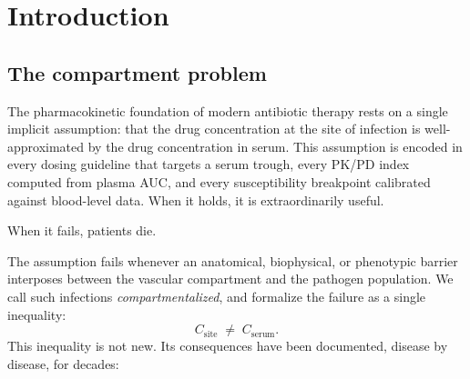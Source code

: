 \documentclass[11pt]{article}
\theoremstyle{plain}
\theoremstyle{definition}
\newcommand{\Csite}{C_{\mathrm{site}}}
\newcommand{\Cserum}{C_{\mathrm{serum}}}
\begin{document}
\clearpage

\section{Introduction}
\label{sec:intro}

\subsection{The compartment problem}
\label{sec:compartment-problem}

The pharmacokinetic foundation of modern antibiotic therapy rests on
a single implicit assumption: that the drug concentration at the site
of infection is well-approximated by the drug concentration in serum.
This assumption is encoded in every dosing guideline that targets a
serum trough, every PK/PD index computed from plasma AUC, and every
susceptibility breakpoint calibrated against blood-level data. When
it holds, it is extraordinarily useful.

When it fails, patients die.

The assumption fails whenever an anatomical, biophysical, or phenotypic
barrier interposes between the vascular compartment and the pathogen
population. We call such infections \emph{compartmentalized}, and
formalize the failure as a single inequality:
%
\begin{equation}
  \label{eq:compartment-inequality}
  \Csite \;\neq\; \Cserum.
\end{equation}
%
This inequality is not new. Its consequences have been documented,
disease by disease, for decades:
\end{document}
